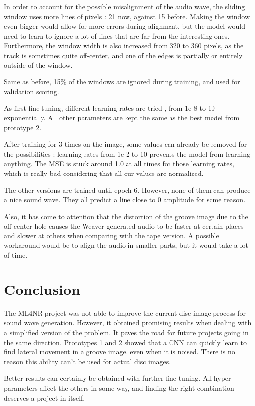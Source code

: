 \documentclass[12pt, twoside]{article}
\begin{document}
In order to account for the possible misalignment of the audio wave, the sliding window uses more lines of pixels : 21 now, against 15 before. Making the window even bigger would allow for more errors during alignment, but the model would need to learn to ignore a lot of lines that are far from the interesting ones. Furthermore, the window width is also increased from 320 to 360 pixels, as the track is sometimes quite off-center, and one of the edges is partially or entirely outside of the window.

Same as before, 15\% of the windows are ignored during training, and used for validation scoring.

As first fine-tuning, different learning rates are tried , from 1e-8 to 10 exponentially. All other parameters are kept the same as the best model from prototype 2.

After training for 3 times on the image, some values can already be removed for the possibilities : learning rates from 1e-2 to 10 prevents the model from learning anything. The MSE is stuck around 1.0 at all times for those learning rates, which is really bad considering that all our values are normalized.

The other versions are trained until epoch 6. However, none of them can produce a nice sound wave. They all predict a line close to 0 amplitude for some reason.

Also, it has come to attention that the distortion of the groove image due to the off-center hole causes the Weaver generated audio to be faster at certain places and slower at others when comparing with the tape version. A possible workaround would be to align the audio in smaller parts, but it would take a lot of time.

\section{Conclusion}
The ML4NR project was not able to improve the current disc image process for sound wave generation. However, it obtained promising results when dealing with a simplified version of the problem. It paves the road for future projects going in the same direction. Prototypes 1 and 2 showed that a CNN can quickly learn to find lateral movement in a groove image, even when it is noised. There is no reason this ability can't be used for actual disc images.

Better results can certainly be obtained with further fine-tuning. All hyper-parameters affect the others in some way, and finding the right combination deserves a project in itself.
\end{document}
